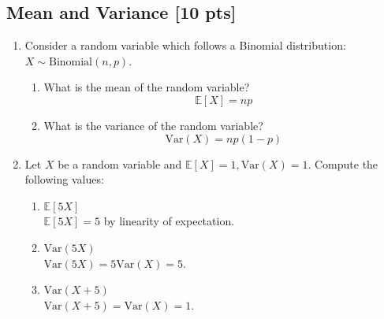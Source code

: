 \documentclass[a4paper]{article}
\theoremstyle{definition}
\newcommand{\Var}{\mathrm{Var}}
\def\E{\mathbb E}
\newenvironment{soln}{
	\leavevmode\color{blue}\ignorespaces
}{}
\begin{document}
	\subsection{Mean and Variance [10 pts]}
	\begin{enumerate}
		\item Consider a random variable which follows a Binomial
		distribution: $X \sim \text{Binomial}(n, p)$.
		\begin{enumerate}
			\item What is the mean of the random variable?\\
			\begin{soln}  \[ \E[X]=np \] \end{soln}
			\item What is the variance of the random variable?\\
			\begin{soln}  \[ \Var(X) = np(1-p) \] \end{soln}
		\end{enumerate}
		
		\item Let $X$ be a random variable and
		$\mathbb{E}[X] = 1, \Var(X) = 1$. Compute the following values:
		\begin{enumerate}
			\item $\mathbb{E}[5X]$\\
			\begin{soln}  $ \E[5X]=5 $ by linearity of expectation. \end{soln}
			\item $\Var(5X)$\\
			\begin{soln}  $ \Var(5X)=5\Var(X) = 5 $. \end{soln}
			\item $\Var(X+5)$\\
			\begin{soln}  $ \Var(X+5)=\Var(X)=1 $. \end{soln}
		\end{enumerate}
	\end{enumerate}
	
	
\end{document}
